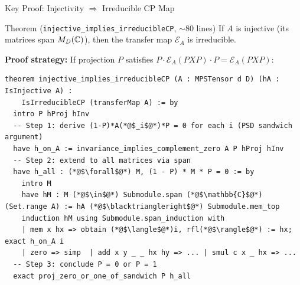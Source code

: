 \documentclass[aspectratio=169,10pt]{beamer}
\begin{document}
\begin{frame}[fragile]{Key Proof: Injectivity $\Rightarrow$ Irreducible CP Map}
\vspace{-0.5em}
\begin{block}{Theorem (\texttt{injective\_implies\_irreducibleCP}, $\sim$80 lines)}
If $A$ is injective (its matrices span $M_D(\mathbb{C})$), then the transfer map $\mathcal{E}_A$ is irreducible.
\end{block}

\vspace{-0.2em}
{\small\textbf{Proof strategy:} If projection $P$ satisfies $P \cdot \mathcal{E}_A(PXP) \cdot P = \mathcal{E}_A(PXP)$:}

\vspace{-0.2em}
\begin{center}
\end{center}

\vspace{-0.2em}
\begin{lstlisting}[basicstyle=\ttfamily\fontsize{5}{6.5}\selectfont\color{white}]
theorem injective_implies_irreducibleCP (A : MPSTensor d D) (hA : IsInjective A) :
    IsIrreducibleCP (transferMap A) := by
  intro P hProj hInv
  -- Step 1: derive (1-P)*A(*@$_i$@*)*P = 0 for each i (PSD sandwich argument)
  have h_on_A := invariance_implies_complement_zero A P hProj hInv
  -- Step 2: extend to all matrices via span
  have h_all : (*@$\forall$@*) M, (1 - P) * M * P = 0 := by
    intro M
    have hM : M (*@$\in$@*) Submodule.span (*@$\mathbb{C}$@*) (Set.range A) := hA (*@$\blacktriangleright$@*) Submodule.mem_top
    induction hM using Submodule.span_induction with
    | mem x hx => obtain (*@$\langle$@*)i, rfl(*@$\rangle$@*) := hx; exact h_on_A i
    | zero => simp  | add x y _ _ hx hy => ... | smul c x _ hx => ...
  -- Step 3: conclude P = 0 or P = 1
  exact proj_zero_or_one_of_sandwich P h_all
\end{lstlisting}
\end{frame}
\end{document}
